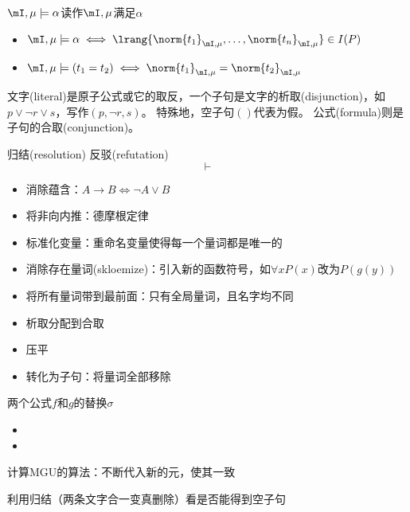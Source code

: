 \begin{definition}[满足]
$\mI,\mu\models\alpha$读作$\mI,\mu$满足$\alpha$
\begin{itemize}
	\item $\mI,\mu\models\alpha\iff\lrang{\norm{t_1}_{\mI,\mu},\ldots,\norm{t_n}_{\mI,\mu}}\in I(P)$
	\item $\mI,\mu\models(t_1=t_2)\iff\norm{t_1}_{\mI,\mu}=\norm{t_2}_{\mI,\mu}$
\end{itemize}
\end{definition}
\begin{definition}[子句(clause)]
文字(literal)是原子公式或它的取反，一个子句是文字的析取(disjunction)，如$p\lor\lnot r\lor s$，写作$(p,\lnot r,s)$。
特殊地，空子句$()$代表为假。
公式(formula)则是子句的合取(conjunction)。
\end{definition}

归结(resolution)
反驳(refutation)
\[\vdash\]

\begin{itemize}
	\item 消除蕴含：$A\to B\iff \lnot A\lor B$
	\item 将非向内推：德摩根定律
	\item 标准化变量：重命名变量使得每一个量词都是唯一的
	\item 消除存在量词(skloemize)：引入新的函数符号，如$\forall x P(x)$改为$P(g(y))$
	\item 将所有量词带到最前面：只有全局量词，且名字均不同
	\item 析取分配到合取
	\item 压平
	\item 转化为子句：将量词全部移除
\end{itemize}

\begin{definition}[MGU]
两个公式$f$和$g$的替换$\sigma$
\begin{itemize}
	\item
	\item
\end{itemize}
\end{definition}

计算MGU的算法：不断代入新的元，使其一致

利用归结（两条文字合一变真删除）看是否能得到空子句

